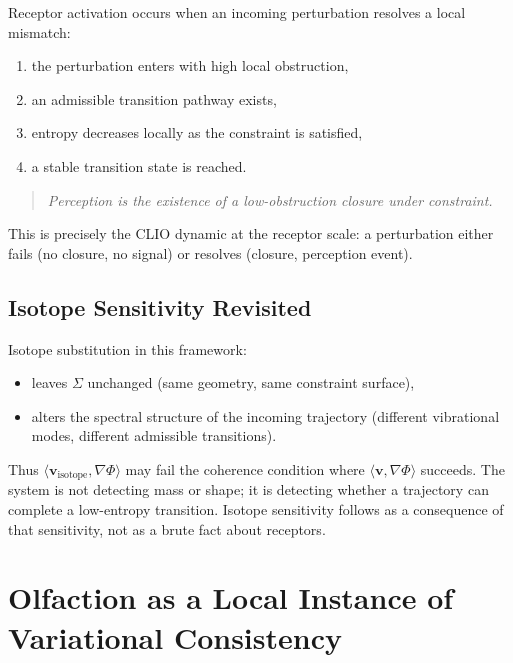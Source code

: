 \documentclass[12pt,a4paper]{article}
\begin{document}
Receptor activation occurs when an incoming perturbation resolves a local mismatch:
\begin{enumerate}[noitemsep]
\item the perturbation enters with high local obstruction,
\item an admissible transition pathway exists,
\item entropy decreases locally as the constraint is satisfied,
\item a stable transition state is reached.
\end{enumerate}

\begin{quote}
\emph{Perception is the existence of a low-obstruction closure under constraint.}
\end{quote}

This is precisely the CLIO dynamic at the receptor scale: a perturbation either fails (no closure, no signal) or resolves (closure, perception event).

\subsection{Isotope Sensitivity Revisited}

Isotope substitution in this framework:
\begin{itemize}
\item leaves $\Sigma$ unchanged (same geometry, same constraint surface),
\item alters the spectral structure of the incoming trajectory (different vibrational modes, different admissible transitions).
\end{itemize}

Thus $\langle \mathbf{v}_{\text{isotope}}, \nabla\Phi \rangle$ may fail the coherence condition where $\langle \mathbf{v}, \nabla\Phi \rangle$ succeeds. The system is not detecting mass or shape; it is detecting whether a trajectory can complete a low-entropy transition. Isotope sensitivity follows as a consequence of that sensitivity, not as a brute fact about receptors.

\section{Olfaction as a Local Instance of Variational Consistency}
\label{sec:olfaction_variational}
\end{document}
